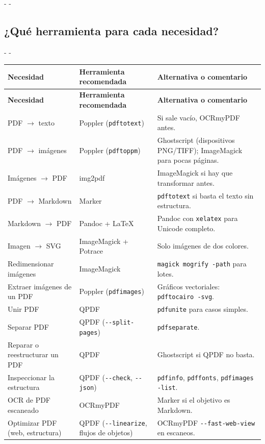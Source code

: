 \documentclass[11pt,a4paper]{article}
\makeatletter
\newcommand{\necesitaespacio}[1]{\par\penalty-100\begingroup
	\setlength{\dimen@}{#1}\dimen@ii\pagegoal\advance\dimen@ii-\pagetotal
	\ifdim\dimen@>\dimen@ii\ifdim\dimen@ii>\z@\vfil\fi\penalty-\@M\fi\endgroup}
\newcommand{\cmd}[1]{\texttt{\textcolor{colcmd}{#1}}}      %
\newcommand{\opt}[1]{\texttt{\textcolor{colopt}{#1}}}      %
\newcommand{\cab}[1]{\textbf{#1}}
\makeatother
\begin{document}
	\necesitaespacio{14\baselineskip}
	\subsection{¿Qué herramienta para cada necesidad?}\label{sec:necesidades}
	
	\begingroup\small
	\necesitaespacio{10\baselineskip}
	\begin{longtable}{L{4.6cm}L{4.2cm}L{6.26cm}}
		\toprule{}\cab{Necesidad} & \cab{Herramienta recomendada} & \cab{Alternativa o comentario}\\\midrule
		\endfirsthead
		\toprule{}\cab{Necesidad} & \cab{Herramienta recomendada} & \cab{Alternativa o comentario}\\\midrule
		\endhead
		\bottomrule
		\endfoot
		PDF $\rightarrow$ texto & Poppler (\cmd{pdftotext}) & Si sale vacío, OCRmyPDF antes.\\*
		PDF $\rightarrow$ imágenes & Poppler (\cmd{pdftoppm}) & Ghostscript (dispositivos PNG/TIFF); ImageMagick para pocas páginas.\\
		Imágenes $\rightarrow$ PDF & img2pdf & ImageMagick si hay que transformar antes.\\
		PDF $\rightarrow$ Markdown & Marker & \cmd{pdftotext} si basta el texto sin estructura.\\
		Markdown $\rightarrow$ PDF & Pandoc + LaTeX & Pandoc con \cmd{xelatex} para Unicode completo.\\
		Imagen $\rightarrow$ SVG & ImageMagick + Potrace & Solo imágenes de dos colores.\\
		Redimensionar imágenes & ImageMagick & \cmd{magick mogrify -path} para lotes.\\
		Extraer imágenes de un PDF & Poppler (\cmd{pdfimages}) & Gráficos vectoriales: \cmd{pdftocairo -svg}.\\
		Unir PDF & QPDF & \cmd{pdfunite} para casos simples.\\
		Separar PDF & QPDF (\opt{-{}-split-pages}) & \cmd{pdfseparate}.\\
		Reparar o reestructurar un PDF & QPDF & Ghostscript si QPDF no basta.\\
		Inspeccionar la estructura & QPDF (\opt{-{}-check}, \opt{-{}-json}) & \cmd{pdfinfo}, \cmd{pdffonts}, \cmd{pdfimages -list}.\\
		OCR de PDF escaneado & OCRmyPDF & Marker si el objetivo es Markdown.\\
		Optimizar PDF (web, estructura) & QPDF (\opt{-{}-linearize}, flujos de objetos) & OCRmyPDF \opt{-{}-fast-\allowbreak{}web-\allowbreak{}view} en escaneos.\\

\end{longtable}
\end{document}
